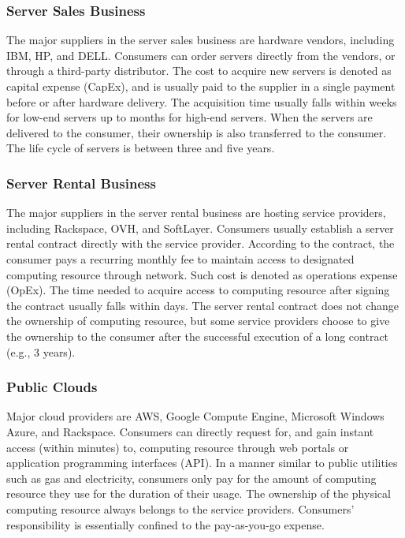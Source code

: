 \documentclass[10pt,journal,cspaper,compsoc]{IEEEtran}
\begin{document}
\subsubsection{Server Sales Business}
The major suppliers in the server sales business are hardware vendors, including IBM, HP, and DELL. Consumers can order servers directly from the vendors, or through a third-party distributor. The cost to acquire new servers is denoted as capital expense (CapEx), and is usually paid to the supplier in a single payment before or after hardware delivery. The acquisition time usually falls within weeks for low-end servers up to months for high-end servers. When the servers are delivered to the consumer, their ownership is also transferred to the consumer. The life cycle of servers is between three and five years.

\subsubsection{Server Rental Business}
The major suppliers in the server rental business are hosting service providers, including Rackspace, OVH, and SoftLayer. Consumers usually establish a server rental contract directly with the service provider. According to the contract, the consumer pays a recurring monthly fee to maintain access to designated computing resource through network. Such cost is denoted as operations expense (OpEx). The time needed to acquire access to computing resource after signing the contract usually falls within days. The server rental contract does not change the ownership of computing resource, but some service providers choose to give the ownership to the consumer after the successful execution of a long contract (e.g., 3 years). 

\subsubsection{Public Clouds}
Major cloud providers are AWS, Google Compute Engine, Microsoft Windows Azure, and Rackspace. Consumers can directly request for, and gain instant access (within minutes) to, computing resource through web portals or application programming interfaces (API). In a manner similar to public utilities such as gas and electricity, consumers only pay for the amount of computing resource they use for the duration of their usage. The ownership of the physical computing resource always belongs to the service providers. Consumers' responsibility is essentially confined to the pay-as-you-go expense. 
\end{document}
